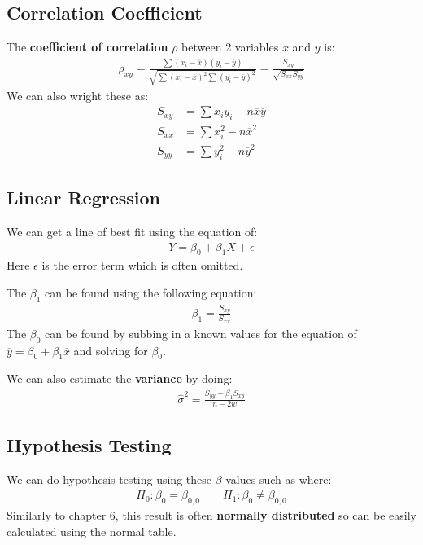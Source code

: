\documentclass[12pt,letterpaper]{article} \usepackage{amsmath} \usepackage{graphicx} \usepackage[margin=1in]{geometry} \usepackage{longtable}  \usepackage{amssymb}
\begin{document}
	\subsection{Correlation Coefficient}
	The \textbf{coefficient of correlation} $\rho$ between 2 variables $x$ and $y$ is:
	\begin{align*}
		\rho_{xy} = \frac{\sum (x_i-\overline x)(y_i-\overline y)}{\sqrt{\sum (x_i - \overline x)^2 \sum(y_i - \overline y)^2}} = \frac{S_{xy}}{\sqrt{S_{xx}S_{yy}}}
	\end{align*}
	We can also wright these as:
	\begin{align*}
		S_{xy} &= \sum x_iy_i - n\overline x \overline y\\
		S_{xx} &= \sum x_i^2 - n\overline x ^2\\
		S_{yy} &= \sum y_i^2 - n\overline y ^2
	\end{align*}
	
	\subsection{Linear Regression}
	We can get a line of best fit using the equation of:
	\begin{align*}
		Y = \beta_0 + \beta_1 X+ \epsilon
	\end{align*}
	Here $\epsilon$ is the error term which is often omitted. 
	
	The $\beta_1$ can be found using the following equation:
	\begin{align*}
		\beta_1 = \frac{S_{xy}}{S_{xx}}
	\end{align*}
	The $\beta_0$ can be found by subbing in a known values for the equation of $\overline y = \beta_0 + \beta_1 \overline x$ and solving for $\beta_0$.
	
	We can also estimate the \textbf{variance} by doing:
	\begin{align*}
		\hat \sigma^2 = \frac{S_{yy} - \beta_1 S_{xy}}{n-2w}
	\end{align*}
	
	\subsection{Hypothesis Testing}
	We can do hypothesis testing using these $\beta$ values such as where:
	\begin{align*}
		H_0: \beta_0 = \beta_{0,0} \qquad H_1: \beta_0 \ne \beta_{0,0}
	\end{align*}
	Similarly to chapter 6, this result is often \textbf{normally distributed} so can be easily calculated using the normal table. 
	
\end{document}
